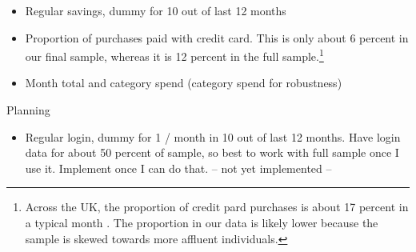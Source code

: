 \begin{itemize}
    \item Regular savings, dummy for 10 out of last 12 months

    \item Proportion of purchases paid with credit card. This is only about 6
        percent in our final sample, whereas it is 12 percent in the full
        sample.\footnote{Across the UK, the proportion of credit pard purchases
            is about 17 percent in a typical month \citep{ukfinance2021card}.
            The proportion in our data is likely lower because the sample is
        skewed towards more affluent individuals.}

    \item Month total and category spend (category spend for robustness)
\end{itemize}

Planning
\begin{itemize}
    \item Regular login, dummy for 1 / month in 10 out of last 12 months. Have
        login data for about 50 percent of sample, so best to work with full
        sample once I use it. Implement once I can do that. -- not yet
        implemented --
\end{itemize}

